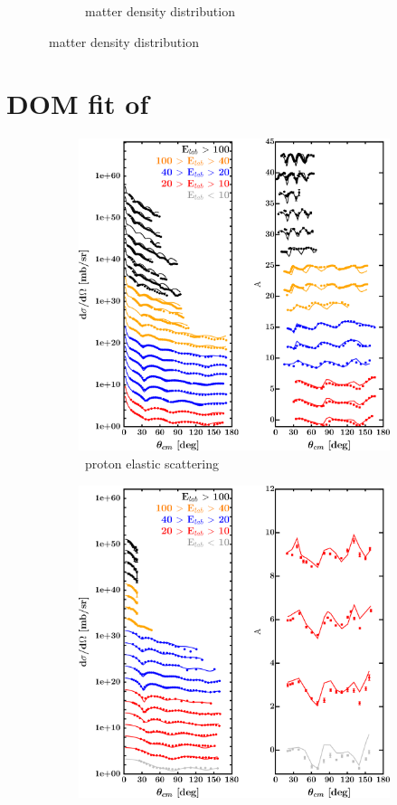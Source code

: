 \begin{figure}[hbtp]
\begin{subfigure}{0.70\textwidth}
        \caption{\oEight\ matter density distribution}
        \label{DOMFitData_o18_matterDensity}
    \end{subfigure}
\end{figure}

\newpage
\section{DOM fit of \caForty}
\label{ca40DOMOutput}
\begin{figure}[hbtp]
    \captionsetup[subfigure]{labelformat=empty}
    \centering
    \begin{subfigure}[c]{0.39\textheight}
        \centering
        \includegraphics[width=\linewidth]{figures/ca40_protonElastic.png}
        \caption{\caForty\ proton elastic scattering}
        \label{DOMFitData_ca40_proton_elastic}
    \end{subfigure}\hspace{6pt}
    \begin{subfigure}[c]{0.39\textheight}
        \centering
        \includegraphics[width=0.52\linewidth]{figures/ca40_neutronElastic.png}

\end{subfigure}
\end{figure}
